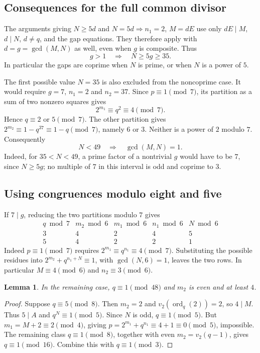 \documentclass[11pt]{article}
\newtheorem{lemma}{Lemma}
\begin{document}
\subsection{Consequences for the full common divisor}
The arguments giving $N\ge5d$ and $N=5d\Rightarrow n_1=2$, $M=dE$
use only $dE\mid M$, $d\mid N$, $d\ne q$, and the gap equations.
They therefore apply with $d=g=\gcd(M,N)$ as well, even when $g$
is composite. Thus
\[
g>1\quad\Longrightarrow\quad N\ge5g\ge35.
\]
In particular the gaps are coprime when $N$ is prime, or when $N$
is a power of $5$.

The first possible value $N=35$ is also excluded from the noncoprime
case. It would require $g=7$, $n_1=2$ and $n_2=37$.
Since $p\equiv1\pmod7$, its partition as a sum of two nonzero
squares gives
\[
2^{m_1}\equiv q^2\equiv4\pmod7.
\]
Hence $q\equiv2$ or $5\pmod7$. The other partition gives
$2^{m_2}\equiv1-q^{37}\equiv1-q\pmod7$, namely $6$ or $3$.
Neither is a power of $2$ modulo $7$. Consequently
\[
\boxed{N<49\quad\Longrightarrow\quad\gcd(M,N)=1.}
\]
Indeed, for $35<N<49$, a prime factor of a nontrivial $g$ would have
to be $7$, since $N\ge5g$; no multiple of $7$ in this interval is
odd and coprime to $3$.

\subsection{Using congruences modulo eight and five}
\label{sec:mod-eight-families}
If $7\mid g$, reducing the two partitions modulo $7$ gives
\[
\begin{array}{c|c|c|c|c}
q\bmod7&m_2\bmod6&m_1\bmod6&n_1\bmod6&N\bmod6\\\hline
3&4&2&4&5\\
5&4&2&2&1
\end{array}
\]
Indeed $p\equiv1\pmod7$ requires
$2^{m_1}\equiv q^{n_1}\equiv4\pmod7$. Substituting the possible
residues into $2^{m_2}+q^{n_1+N}\equiv1$, with $\gcd(N,6)=1$,
leaves the two rows. In particular $M\equiv4\pmod6$ and
$n_2\equiv3\pmod6$.

\begin{lemma}\label{lem:q-one-mod-eight}
In the remaining case, $q\equiv1\pmod{48}$ and $m_2$ is even and
at least $4$.
\end{lemma}
\begin{proof}
Suppose $q\equiv5\pmod8$. Then $m_2=2$ and
$v_2(\operatorname{ord}_q(2))=2$, so $4\mid M$.
Thus $5\mid A$ and $q^N\equiv1\pmod5$. Since $N$ is odd,
$q\equiv1\pmod5$. But $m_1=M+2\equiv2\pmod4$, giving
$p=2^{m_1}+q^{n_1}\equiv4+1\equiv0\pmod5$, impossible.
The remaining class $q\equiv1\pmod8$, together with even
$m_2=v_2(q-1)$, gives $q\equiv1\pmod{16}$.
Combine this with $q\equiv1\pmod3$.
\end{proof}
\end{document}
